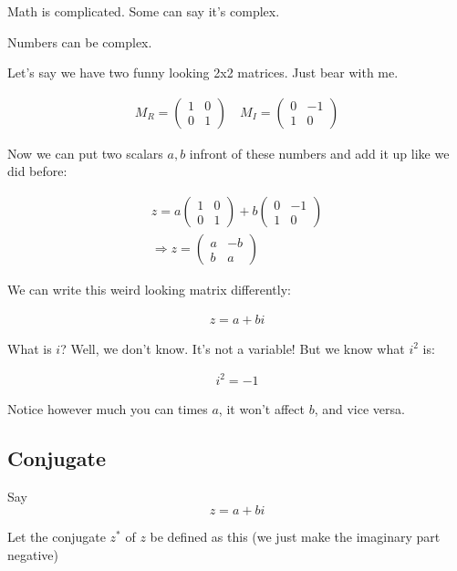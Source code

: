 \documentclass[
]{article}
\providecommand{\Rarr}{\Rightarrow}
\begin{document}
Math is complicated. Some can say it's complex.

Numbers can be complex.

Let's say we have two funny looking 2x2 matrices. Just bear with me.

\begin{gather*}
	M_R=\begin{pmatrix}1 & 0 \\
	               0 & 1
	\end{pmatrix}\quad
	M_I=\begin{pmatrix}0 & -1 \\
	               1 & 0
	\end{pmatrix}
\end{gather*}

Now we can put two scalars \(a,b\) infront of these numbers and add it
up like we did before:

\begin{gather*}
	z=a\begin{pmatrix}1 & 0 \\
	               0 & 1
	\end{pmatrix}+b\begin{pmatrix}0 & -1 \\
	               1 & 0
	\end{pmatrix}\\
	\Rarr z=\begin{pmatrix}a & -b \\
	               b & a
	\end{pmatrix}
\end{gather*}

We can write this weird looking matrix differently:

\begin{gather*}
	z=a+bi
\end{gather*}

What is \(i\)? Well, we don't know. It's not a variable! But we know
what \(i^2\) is:

\begin{gather*}
	i^2=-1
\end{gather*}

Notice however much you can times \(a\), it won't affect \(b\), and vice
versa.

\subsection{Conjugate}\label{conjugate}
Say
\[
	z=a+bi
\]

Let the conjugate \(z^*\) of \(z\) be defined as this (we just
make the imaginary part negative)
\end{document}
